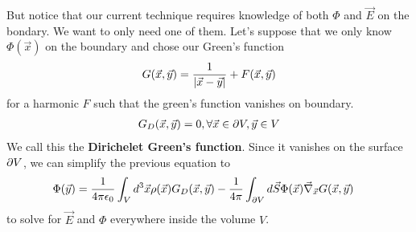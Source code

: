 But notice that our current technique requires knowledge of both $\Phi$ and $\vec{E}$ on the bondary.
We want to only need one of them.
Let's suppose that we only know $\Phi(\vec{x})$ on the boundary and chose our Green's function
\begin{align*}
  G(\vec{x},\vec{y}) = \frac{1}{\vert\vec{x} - \vec{y}\vert} + F(\vec{x},\vec{y})
\end{align*}
for a harmonic $F$ such that the green's function vanishes on boundary.
\begin{align*}
  G_D(\vec{x}, \vec{y}) = 0, \forall \vec{x} \in \partial V, \vec{y} \in V
\end{align*}
We call this the \textbf{Dirichelet Green's function}. 
Since it vanishes on the surface $\partial V$, we can simplify the previous equation to
\begin{align*}
  \Phi(\vec{y}) &= \frac{1}{4 \pi \epsilon_0} \int_V d^{3}\vec{x} \rho(\vec{x}) G_D(\vec{x},\vec{y})
  -
  \frac{1}{4 \pi} \int_{\partial V} d \vec{S} \Phi(\vec{x}) \vec{\nabla}_{\vec{x}}G(\vec{x},\vec{y})
\end{align*}
to solve for $\vec{E}$ and $\Phi$ everywhere inside the volume $V$.

